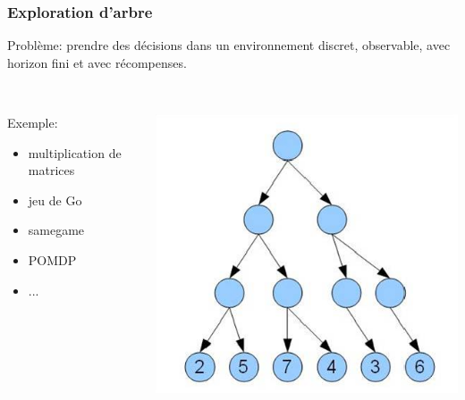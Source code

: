 \documentclass{beamer}
\begin{document}
\begin{frame}
    \frametitle{Exploration d'arbre}
    Problème: prendre des décisions dans un environnement discret, observable, avec horizon fini et avec récompenses.
\\~
    \begin{columns}
    \begin{column}[l]{5cm}
        Exemple:
        \begin{itemize}
            \item multiplication de matrices
            \item jeu de Go
            \item samegame
            \item POMDP
            \item ...
        \end{itemize}
    \end{column}
    \begin{column}[r]{5cm}
        \begin{center}
            \includegraphics[scale=0.4]{tree.jpg}
        \end{center}
    \end{column}
    \end{columns}

\end{frame}
\end{document}
